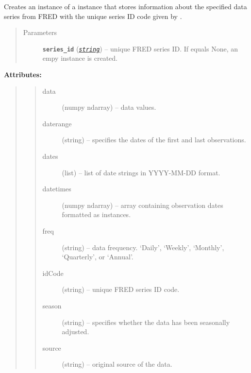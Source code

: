 \documentclass[letterpaper,10pt,openany,oneside]{sphinxmanual}
\begin{document}
\begin{fulllineitems}
\label{series_class:fredpy.series}
Creates an instance of a {\hyperref[series_class:fredpy.series]{}} instance that stores information about the specified data series from FRED with the unique series ID code given by .
\begin{quote}\begin{description}
\item[{Parameters}] \leavevmode
\textbf{\texttt{series\_id}} (\href{https://docs.python.org/library/string.html\#module-string}{\emph{\texttt{string}}}) -- unique FRED series ID. If  equals None, an empy {\hyperref[series_class:fredpy.series]{}} instance is created.

\end{description}\end{quote}

\textbf{Attributes:}
\begin{quote}
\begin{quote}\begin{description}
\item[{data}] \leavevmode
(numpy ndarray) --  data values.

\item[{daterange}] \leavevmode
(string) -- specifies the dates of the first and last observations.

\item[{dates}] \leavevmode
(list) -- list of date strings in YYYY-MM-DD format.

\item[{datetimes}] \leavevmode
(numpy ndarray) -- array containing observation dates formatted as \href{https://docs.python.org/library/datetime.html\#datetime.datetime}{} instances.

\item[{freq}] \leavevmode
(string) -- data frequency. `Daily', `Weekly', `Monthly', `Quarterly', or `Annual'.

\item[{idCode}] \leavevmode
(string) -- unique FRED series ID code.

\item[{season}] \leavevmode
(string) -- specifies whether the data has been seasonally adjusted.

\item[{source}] \leavevmode
(string) -- original source of the data.


\end{description}
\end{quote}
\end{quote}
\end{fulllineitems}
\end{document}
